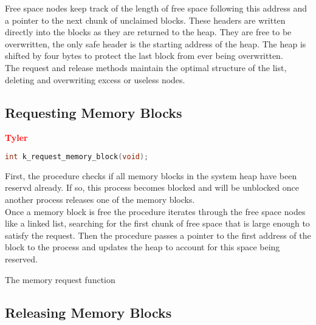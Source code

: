 \documentclass[12pt]{report}
\begin{document}
Free space nodes keep track of the length of free space following this address and a pointer to the next chunk of unclaimed blocks. These headers are written directly into the blocks as they are returned to the heap. They are free to be overwritten, the only safe header is the starting address of the heap. The heap is shifted by four bytes to protect the last block from ever being overwritten. \\

The request and release methods maintain the optimal structure of the list, deleting and overwriting excess or useless nodes.\\


\subsection{Requesting Memory Blocks}

\textcolor{red}{\textbf{Tyler}} \\
\begin{minipage}{\textwidth}
\begin{lstlisting}[language=C, frame=single]
int k_request_memory_block(void);
\end{lstlisting}
\end{minipage}

First, the procedure checks if all memory blocks in the system heap have been reservd already. If so, this process becomes blocked and will be unblocked once another process releases one of the memory blocks. \\
Once a memory block is free the procedure iterates through the free space nodes like a linked list, searching for the first chunk of free space that is large enough to satisfy the request. Then the procedure passes a pointer to the first address of the block to the process and updates the heap to account for this space being reserved. \\

\begin{algorithm}
  \caption{The memory request function}
  \begin{algorithmic}[1]
	  \EndWhile
    \EndProcedure
  \end{algorithmic}
\end{algorithm}

\subsection{Releasing Memory Blocks}
\end{document}
